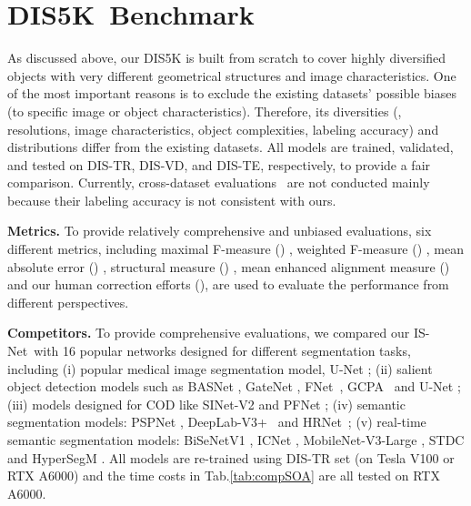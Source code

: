 \documentclass[10pt,twocolumn,letterpaper]{article}
\newcommand{\tabref}[1]{Tab.\ref{#1}}
\def\ourmodel{IS-Net}
\def \ourdataset{DIS5K}
\begin{document}
\section{\ourdataset~Benchmark}
As discussed above, our DIS5K is built from scratch to cover highly diversified objects with very different geometrical structures and image characteristics. One of the most important reasons is to exclude the existing datasets' possible biases (to specific image or object characteristics). Therefore, its diversities (\eg, resolutions, image characteristics, object complexities, labeling accuracy) and distributions differ from the existing datasets. All models are trained, validated, and tested on DIS-TR, DIS-VD, and DIS-TE, respectively, to provide a fair comparison. Currently, cross-dataset evaluations~\cite{torralba2011unbiased} are not conducted mainly because their labeling accuracy is not consistent with ours.


\noindent\textbf{Metrics.}
To provide relatively comprehensive and unbiased evaluations, six different metrics, including maximal F-measure () \cite{achanta2009frequency}, weighted F-measure () \cite{Margolin2014HowTE}, mean absolute error () \cite{perazzi2012saliency}, structural measure () \cite{fan2017structure}, mean enhanced alignment measure () \cite{fan2018enhanced,fan2021cognitive} and our human correction efforts (), are used to evaluate the performance from different perspectives. 

\noindent\textbf{Competitors.}
To provide comprehensive evaluations, we compared our \ourmodel~with 16 popular networks designed for different segmentation tasks, including 
(i) popular medical image segmentation model, U-Net \cite{ronneberger2015u}; 
(ii) salient object detection models such as BASNet \cite{qin2019basnet}, GateNet \cite{zhao2020suppress}, FNet~\cite{wei2020f3net}, GCPA~\cite{chen2020global} and U-Net \cite{qin2020u2}; 
(iii) models designed for COD like SINet-V2\cite{fan2021concealed} and PFNet \cite{Mei_2021_CVPR}; 
(iv) semantic segmentation models: PSPNet \cite{zhao2017pyramid}, DeepLab-V3+~\cite{chen2018encoder} and HRNet~\cite{WangSCJDZLMTWLX19}; 
(v) real-time semantic segmentation models: BiSeNetV1 \cite{yu2018bisenet}, ICNet \cite{zhao2018icnet}, MobileNet-V3-Large \cite{DBLP:conf/iccv/HowardPALSCWCTC19}, STDC \cite{fan2021rethinking} and HyperSegM \cite{nirkin2020hyperseg}. 
All models are re-trained using DIS-TR set (on Tesla V100 or RTX A6000) and the time costs in \tabref{tab:compSOA} are all tested on RTX A6000. 
\end{document}
